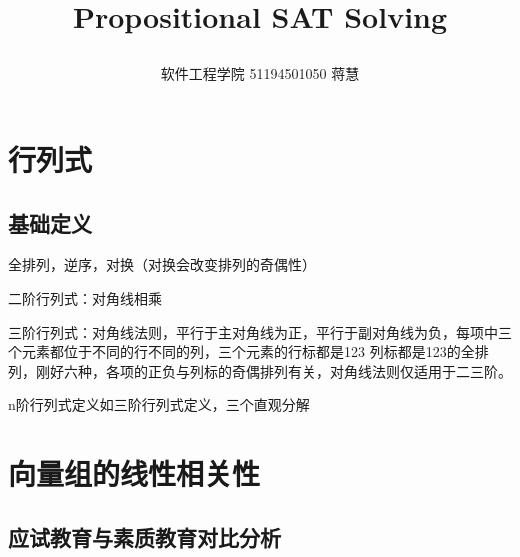 \documentclass[UTF8]{ctexart}
\begin{document}
	\title{\textbf{Propositional SAT Solving}\\[1ex]\begin{large}
		\end{large}}
	\author{软件工程学院 51194501050 蒋慧}
	\maketitle


\section{行列式}
	\subsection{基础定义}
	\par{全排列，逆序，对换（对换会改变排列的奇偶性）}
	\par{二阶行列式：对角线相乘}
	\par{三阶行列式：对角线法则，平行于主对角线为正，平行于副对角线为负，每项中三个元素都位于不同的行不同的列，三个元素的行标都是123 列标都是123的全排列，刚好六种，各项的正负与列标的奇偶排列有关，对角线法则仅适用于二三阶。}
	\par{n阶行列式定义如三阶行列式定义，三个直观分解}
	\par{}
	\par{}
	\par{}
	\par{}
	\par{}
	\par{}
	\par{}
	\par{}
	\par{}
	\subsection{}

	\par{}

\section{向量组的线性相关性}
	\subsection{}
	
	\subsection{应试教育与素质教育对比分析}
\end{document}
